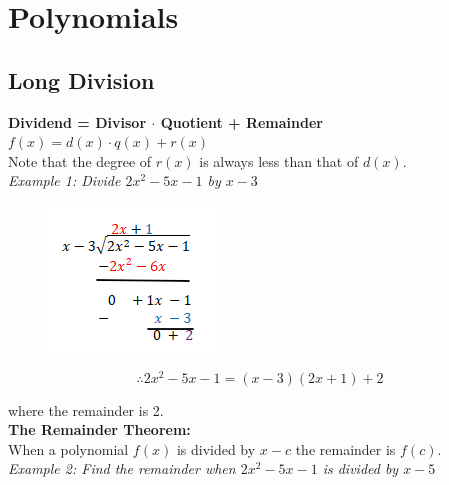 \documentclass{article}
\begin{document}
    \pagebreak


    \section{Polynomials}

    \subsection{Long Division}

    \color{purple} \textbf{Dividend = Divisor $\cdot$ Quotient + Remainder} \color{black} \\
    \noindent $f(x)=d(x)\cdot q(x)+r(x)$ \\
    \noindent Note that the degree of $r(x)$ is always less than that of $d(x)$. \\

    \noindent \color{blue} \textit{Example 1: Divide $2x^2-5x-1$ by $x-3$} \color{black} \\

    \begin{figure} [hbt!]
        \centering
        \includegraphics[scale = 0.8] {Resources/Unit3Polynomials/longdiv.PNG}
    \end{figure}

    \begin{equation*}
        \therefore 2x^2-5x-1 = (x-3)(2x+1)+2
    \end{equation*}

    \noindent where the remainder is 2. \\

    \noindent \color{purple} \textbf{The Remainder Theorem:} \color{black} \\
    \noindent When a polynomial $f(x)$ is divided by $x-c$ the remainder is $f(c)$. \\

    \noindent \color{blue} \textit{Example 2: Find the remainder when $2x^2-5x-1$ is
    divided by $x-5$} \color{black} \\
\end{document}
